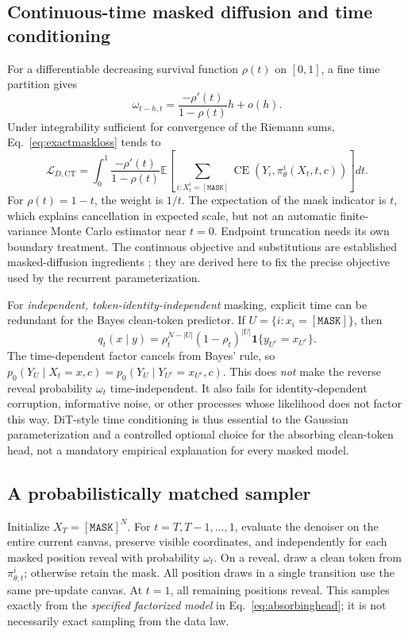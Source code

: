 \documentclass{article}
\theoremstyle{remark}\newtheorem{remark}[theorem]{Remark}
\newcommand{\E}{\mathbb E}
\newcommand{\mask}{\mathtt{[MASK]}}
\begin{document}
\subsection{Continuous-time masked diffusion and time conditioning}
For a differentiable decreasing survival function $\rho(t)$ on $[0,1]$, a fine time partition gives
\begin{equation}
 \omega_{t-h,t}=\frac{-\rho'(t)}{1-\rho(t)}h+o(h).
\end{equation}
Under integrability sufficient for convergence of the Riemann sums, Eq.~\eqref{eq:exactmaskloss} tends to
\begin{equation}
 \mathcal L_{D,\mathrm{CT}}=
 \int_0^1\frac{-\rho'(t)}{1-\rho(t)}
 \E\left[\sum_{i:X_t^i=\mask}\operatorname{CE}(Y_i,\pi_\theta^i(X_t,t,c))\right]dt.
 \label{eq:ctmaskloss}
\end{equation}
For $\rho(t)=1-t$, the weight is $1/t$. The expectation of the mask indicator is $t$, which explains cancellation in expected scale, but not an automatic finite-variance Monte Carlo estimator near $t=0$. Endpoint truncation needs its own boundary treatment. The continuous objective and substitutions are established masked-diffusion ingredients \cite{mdlm,md4}; they are derived here to fix the precise objective used by the recurrent parameterization.

For \emph{independent, token-identity-independent} masking, explicit time can be redundant for the Bayes clean-token predictor. If $U=\{i:x_i=\mask\}$, then
\begin{equation}
 q_t(x\mid y)=\rho_t^{N-|U|}(1-\rho_t)^{|U|}
 \mathbf1\{y_{U^c}=x_{U^c}\}.
\end{equation}
The time-dependent factor cancels from Bayes' rule, so
$p_0(Y_U\mid X_t=x,c)=p_0(Y_U\mid Y_{U^c}=x_{U^c},c)$.
This does \emph{not} make the reverse reveal probability $\omega_t$ time-independent. It also fails for identity-dependent corruption, informative noise, or other processes whose likelihood does not factor this way. DiT-style time conditioning is thus essential to the Gaussian parameterization and a controlled optional choice for the absorbing clean-token head, not a mandatory empirical explanation for every masked model.

\subsection{A probabilistically matched sampler}
Initialize $X_T=\mask^N$. For $t=T,T-1,\ldots,1$, evaluate the denoiser on the entire current canvas, preserve visible coordinates, and independently for each masked position reveal with probability $\omega_t$. On a reveal, draw a clean token from $\pi_{\theta,t}^i$; otherwise retain the mask. All position draws in a single transition use the same pre-update canvas. At $t=1$, all remaining positions reveal. This samples exactly from the \emph{specified factorized model} in Eq.~\eqref{eq:absorbinghead}; it is not necessarily exact sampling from the data law.
\end{document}
